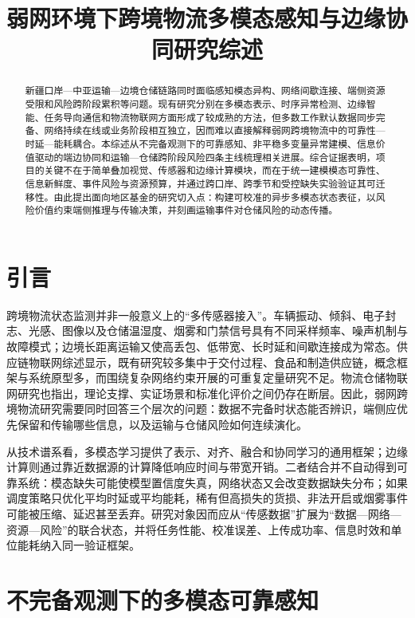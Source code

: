 \documentclass[UTF8,12pt,a4paper]{ctexart}
\title{弱网环境下跨境物流多模态感知与边缘协同研究综述}
\author{}
\date{}
\begin{document}
\maketitle

\begin{abstract}
新疆口岸—中亚运输—边境仓储链路同时面临感知模态异构、网络间歇连接、端侧资源受限和风险跨阶段累积等问题。现有研究分别在多模态表示、时序异常检测、边缘智能、任务导向通信和物流物联网方面形成了较成熟的方法，但多数工作默认数据同步完备、网络持续在线或业务阶段相互独立，因而难以直接解释弱网跨境物流中的可靠性—时延—能耗耦合。本综述从不完备观测下的可靠感知、非平稳多变量异常建模、信息价值驱动的端边协同和运输—仓储跨阶段风险四条主线梳理相关进展。综合证据表明，项目的关键不在于简单叠加视觉、传感器和边缘计算模块，而在于统一建模模态可靠性、信息新鲜度、事件风险与资源预算，并通过跨口岸、跨季节和受控缺失实验验证其可迁移性。由此提出面向地区基金的研究切入点：构建可校准的异步多模态状态表征，以风险价值约束端侧推理与传输决策，并刻画运输事件对仓储风险的动态传播。
\end{abstract}

\section{引言}

跨境物流状态监测并非一般意义上的“多传感器接入”。车辆振动、倾斜、电子封志、光感、图像以及仓储温湿度、烟雾和门禁信号具有不同采样频率、噪声机制与故障模式；边境长距离运输又使高丢包、低带宽、长时延和间歇连接成为常态。供应链物联网综述显示，既有研究较多集中于交付过程、食品和制造供应链，概念框架与系统原型多，而围绕复杂网络约束开展的可重复定量研究不足\cite{internetofthings2019}。物流仓储物联网研究也指出，理论支撑、实证场景和标准化评价之间仍存在断层\cite{applicationsofthe2022}。因此，弱网跨境物流研究需要同时回答三个层次的问题：数据不完备时状态能否辨识，端侧应优先保留和传输哪些信息，以及运输与仓储风险如何连续演化。

从技术谱系看，多模态学习提供了表示、对齐、融合和协同学习的通用框架\cite{multimodalmachinelearning2018}；边缘计算则通过靠近数据源的计算降低响应时间与带宽开销\cite{edgecomputingvision2016}。二者结合并不自动得到可靠系统：模态缺失可能使模型置信度失真，网络状态又会改变数据缺失分布；如果调度策略只优化平均时延或平均能耗，稀有但高损失的货损、非法开启或烟雾事件可能被压缩、延迟甚至丢弃。研究对象因而应从“传感数据”扩展为“数据—网络—资源—风险”的联合状态，并将任务性能、校准误差、上传成功率、信息时效和单位能耗纳入同一验证框架。

\section{不完备观测下的多模态可靠感知}
\end{document}
